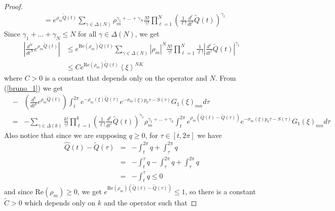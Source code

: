\documentclass[sn-mathphys-num]{sn-jnl}%
\numberwithin{equation}{section}
\theoremstyle{thmstyleone}
\theoremstyle{thmstyletwo}
\theoremstyle{thmstylethree}
\renewcommand{\Re}{\textrm{Re}}
\def\jp#1{{\left\langle{#1}\right\rangle}}
\begin{document}
\begin{proof}
\begin{align}
 	 & = e^{\rho_m \widetilde{Q}(t)} \sum_{\gamma \in \Delta(N)} \rho_m^{\gamma_1+...+\gamma_N} \frac{N!}{\gamma!}\prod_{\ell=1}^N \left(\frac{1}{\ell!} \frac{d^\ell}{dt^{\ell}} \widetilde{Q}(t) \right)^{\gamma_\ell}
 \end{align}
 Since $\gamma_1+...+\gamma_N \leq N$ for all $\gamma \in \Delta(N)$, we get
 \begin{align}\label{bruno_2}
 	\left| 	\frac{d^N}{dt^N} e^{\rho_m \widetilde{Q}(t)} \right| & \leq e^{\Re(\rho_m) \widetilde{Q}(t)} \sum_{\gamma \in \Delta(N)} |\rho_m|^N \frac{N!}{\gamma!}\prod_{\ell=1}^N \frac{1}{\ell!}\left| \frac{d^\ell}{dt^{\ell}} \widetilde{Q}(t) \right|^{\gamma_\ell} \nonumber \\
 	& \leq C e^{\Re(\rho_m)\widetilde{Q}(t)} \jp{\xi}^{NK} 
 \end{align}
 where $C>0$ is a constant that depends only on the operator and $N$. From (\ref{bruno_1}) we get
 \begin{eqnarray*}
  & - & \left( \frac{d^k}{dt^k} e^{\rho_m\widetilde{Q}(t)} \right) \int_t^{2\pi}e^{-\rho_m(\xi) \widetilde{Q}(\tau)}e^{-\sigma_m(\xi)p_0 \tau -S(\tau)}G_1(\xi)_{mn}d\tau\\
  & = & -\sum_{\gamma \in \Delta(k)} \frac{k!}{\gamma!} \prod_{\ell=1}^k \left( \frac{1}{\ell!} \frac{d^\ell}{dt^{\ell}} \widetilde{Q}(t)\right)^{\gamma_\ell} \rho_m^{\gamma_1+...+\gamma_k} \int_t^{2\pi} e^{\rho_m(\widetilde{Q}(t)-\widetilde{Q}(\tau))}e^{-\sigma_m(\xi)p_0 \tau-S(\tau)}G_1(\xi)_{mn}d\tau  
 \end{eqnarray*}
 Also notice that since we are supposing $q\geq 0$, for $\tau \in [t,2\pi]$ we have
 \begin{eqnarray*}
 	\widehat{Q}(t)-\widetilde{Q}(\tau) & = & -\int_t^{2\pi} q+\int_\tau^{2\pi} q\\
 	& = & -\int_t^\tau q -\int_\tau^{2\pi}q + \int_\tau^{2\pi} q \\
 	& = & -\int_t^\tau q \leq 0
 \end{eqnarray*}
 and since $\Re(\rho_m)\geq 0$, we get $e^{\Re(\rho_m)(\widetilde{Q}(t)-\widetilde{Q}(\tau))}\leq 1 $, so there is a constant $\widetilde{C}>0$ which depends only on $k$ and the operator such that
 

\end{proof}
\end{document}
